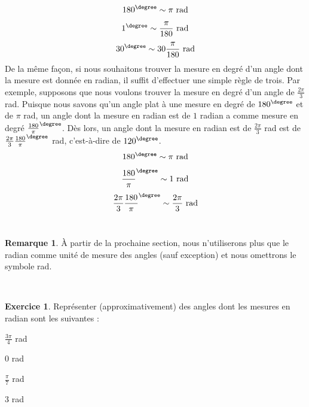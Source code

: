 \documentclass[a4paper,fontsize=13pt]{scrreprt}
\theoremstyle{plain}
\theoremstyle{definition}
\newtheorem{rema}[subsection]{Remarque}
\newtheorem{exo}[subsection]{Exercice}
\begin{document}
$${180}^{\degree} \sim \pi \mbox{~rad}$$
$${1}^{\degree}  \sim \frac{\pi}{180} \mbox{~rad}$$
$${30}^{\degree}  \sim 30\frac{\pi}{180} \mbox{~rad}$$
De la même façon, si nous souhaitons trouver la mesure en degré d'un angle dont la mesure est donnée en radian, il suffit d'effectuer une simple règle de trois. Par exemple, supposons que nous voulons trouver la mesure en degré d'un angle de $\frac{2\pi}{3}$ rad. Puisque nous savons qu'un angle plat à une mesure en degré de ${180}^{\degree}$ et de $\pi$ rad, un angle dont la mesure en radian est de $1$ radian a comme mesure en degré ${\frac{180}{\pi}}^{\degree}$. Dès lors, un angle dont la mesure en radian est de $\frac{2\pi}{3}$ rad est de ${\frac{2\pi}{3} \frac{180}{\pi}}^{\degree}$ rad, c'est-à-dire de ${120}^{\degree}$.
\newpage
$${180}^{\degree} \sim \pi \mbox{~rad}$$
$${\frac{180}{\pi}}^{\degree}  \sim 1 \mbox{~rad}$$
$${\frac{2\pi}{3} \frac{180}{\pi}}^{\degree}  \sim \frac{2\pi}{3} \mbox{~rad}$$
~\\
\begin{rema}
\`A partir de la prochaine section, nous n'utiliserons plus que le radian comme unité de mesure des angles (sauf exception) et nous omettrons le symbole rad.
\end{rema}
~\\
\begin{exo}
Représenter (approximativement) des angles dont les mesures en radian sont les suivantes :
\begin{enumerate}
\begin{multicols}{2}
\item $\frac{3\pi}{4}$ rad
\item $0$ rad
\item $\frac{\pi}{7}$ rad
\item $3$ rad
\end{multicols}
\end{enumerate}
\end{exo}
\end{document}
